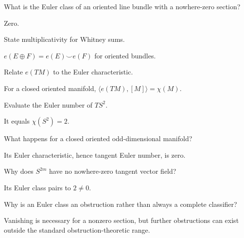 \begin{problem}
What is the Euler class of an oriented line bundle with a nowhere-zero section?
\end{problem}
\begin{solution}
Zero.
\end{solution}

\begin{problem}
State multiplicativity for Whitney sums.
\end{problem}
\begin{solution}
$e(E\oplus F)=e(E)\smile e(F)$ for oriented bundles.
\end{solution}

\begin{problem}
Relate $e(TM)$ to the Euler characteristic.
\end{problem}
\begin{solution}
For a closed oriented manifold, $\langle e(TM),[M]\rangle=\chi(M)$.
\end{solution}

\begin{problem}
Evaluate the Euler number of $TS^2$.
\end{problem}
\begin{solution}
It equals $\chi(S^2)=2$.
\end{solution}

\begin{problem}
What happens for a closed oriented odd-dimensional manifold?
\end{problem}
\begin{solution}
Its Euler characteristic, hence tangent Euler number, is zero.
\end{solution}

\begin{problem}
Why does $S^{2m}$ have no nowhere-zero tangent vector field?
\end{problem}
\begin{solution}
Its Euler class pairs to $2\ne0$.
\end{solution}

\begin{problem}
Why is an Euler class an obstruction rather than always a complete classifier?
\end{problem}
\begin{solution}
Vanishing is necessary for a nonzero section, but further obstructions can exist outside the standard obstruction-theoretic range.
\end{solution}

